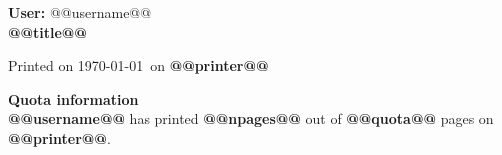 \documentclass[a4paper]{article}
\begin{document}
    \thispagestyle{empty}
    \sffamily

    \begin{center}
        \Large
        \textbf{User:} @@username@@ \\
        \textbf{@@title@@} \\[4cm]     
    \end{center}

    \large
    \noindent Printed on \today\ on \textbf{@@printer@@} \\[2cm]

    \vfill

    \noindent \textbf{Quota information} \\[.05cm]
    \noindent \textbf{@@username@@} has printed 
    \textbf{@@npages@@} out of \textbf{@@quota@@}
    pages on \textbf{@@printer@@}.
\end{document}
